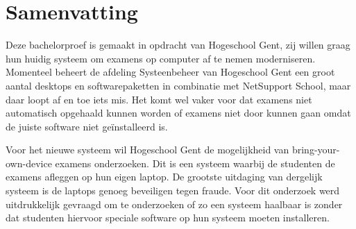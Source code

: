 
%
%

%



\chapter*{Samenvatting}

Deze bachelorproef is gemaakt in opdracht van Hogeschool Gent, zij willen graag hun huidig systeem om examens op computer af te nemen moderniseren. Momenteel beheert de afdeling Systeenbeheer van Hogeschool Gent een groot aantal desktops en softwarepaketten in combinatie met NetSupport School, maar daar loopt af en toe iets mis. Het komt wel vaker voor dat examens niet automatisch opgehaald kunnen worden of examens niet door kunnen gaan omdat de juiste software niet ge\"{i}nstalleerd is. 

Voor het nieuwe systeem wil Hogeschool Gent de mogelijkheid van bring-your-own-device examens onderzoeken. Dit is een systeem waarbij de studenten de examens afleggen op hun eigen laptop. De grootste uitdaging van dergelijk systeem is de laptops genoeg beveiligen tegen fraude. Voor dit onderzoek werd uitdrukkelijk gevraagd om te onderzoeken of zo een systeem haalbaar is zonder dat studenten hiervoor speciale software op hun systeem moeten installeren.

